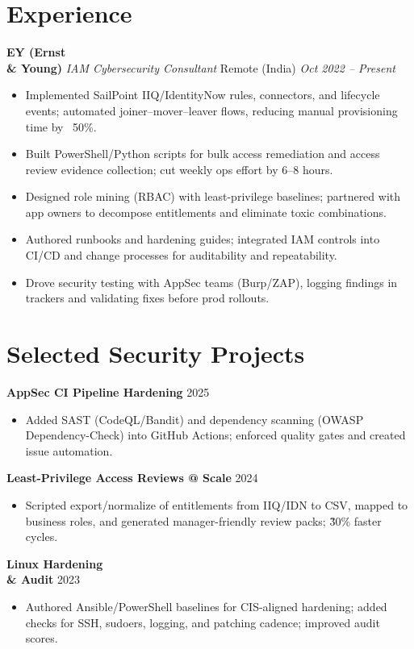 \documentclass[11pt]{article}
\newcommand{\location}[1]{\hfill {\small #1}}
\newcommand{\daterange}[1]{\hfill {\small #1}}
\begin{document}
\section*{Experience}
\textbf{EY (Ernst \\& Young)} \emph{IAM Cybersecurity Consultant} \location{Remote (India)} \daterange{\textit{Oct 2022 -- Present}}\\
\begin{itemize}
  \item Implemented SailPoint IIQ/IdentityNow rules, connectors, and lifecycle events; automated joiner–mover–leaver flows, reducing manual provisioning time by ~50\%.
  \item Built PowerShell/Python scripts for bulk access remediation and access review evidence collection; cut weekly ops effort by 6–8 hours.
  \item Designed role mining (RBAC) with least-privilege baselines; partnered with app owners to decompose entitlements and eliminate toxic combinations.
  \item Authored runbooks and hardening guides; integrated IAM controls into CI/CD and change processes for auditability and repeatability.
  \item Drove security testing with AppSec teams (Burp/ZAP), logging findings in trackers and validating fixes before prod rollouts.
\end{itemize}

\section*{Selected Security Projects}
\textbf{AppSec CI Pipeline Hardening} \daterange{2025}\\
\begin{itemize}
  \item Added SAST (CodeQL/Bandit) and dependency scanning (OWASP Dependency-Check) into GitHub Actions; enforced quality gates and created issue automation.
\end{itemize}
\textbf{Least-Privilege Access Reviews @ Scale} \daterange{2024}\\
\begin{itemize}
  \item Scripted export/normalize of entitlements from IIQ/IDN to CSV, mapped to business roles, and generated manager-friendly review packs; \~30\% faster cycles.
\end{itemize}
\textbf{Linux Hardening \\& Audit} \daterange{2023}\\
\begin{itemize}
  \item Authored Ansible/PowerShell baselines for CIS-aligned hardening; added checks for SSH, sudoers, logging, and patching cadence; improved audit scores.
\end{itemize}
\end{document}
